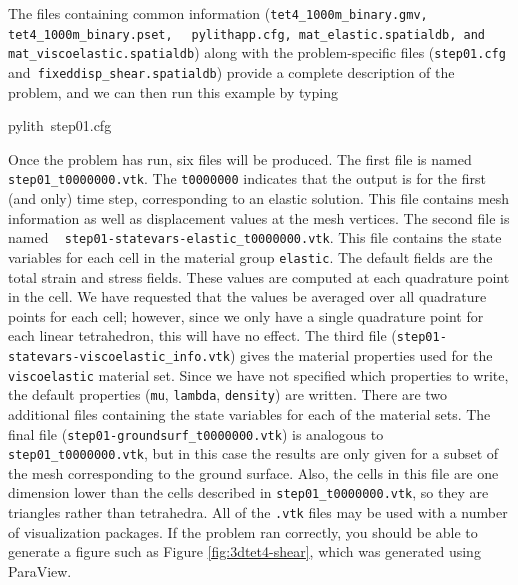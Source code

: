 The files containing common information (\texttt{tet4\_1000m\_binary.gmv,
tet4\_1000m\_binary.pset, }~\linebreak{}
\texttt{pylithapp.cfg, mat\_elastic.spatialdb, and mat\_viscoelastic.spatialdb})
along with the problem-specific files (\texttt{step01.cfg }and\texttt{
fixeddisp\_shear.spatialdb}) provide a complete description of the
problem, and we can then run this example by typing
\begin{lyxcode}
pylith~step01.cfg
\end{lyxcode}
Once the problem has run, six files will be produced. The first file
is named \texttt{step01\_t0000000.vtk}. The \texttt{t0000000} indicates
that the output is for the first (and only) time step, corresponding
to an elastic solution. This file contains mesh information as well
as displacement values at the mesh vertices. The second file is named
\texttt{}~\linebreak{}
\texttt{step01-statevars-elastic\_t0000000.vtk}. This file contains
the state variables for each cell in the material group \texttt{elastic}.
The default fields are the total strain and stress fields. These values
are computed at each quadrature point in the cell. We have requested
that the values be averaged over all quadrature points for each cell;
however, since we only have a single quadrature point for each linear
tetrahedron, this will have no effect. The third file (\texttt{step01-statevars-viscoelastic\_info.vtk})
gives the material properties used for the \texttt{viscoelastic} material
set. Since we have not specified which properties to write, the default
properties (\texttt{mu}, \texttt{lambda}, \texttt{density}) are written.
There are two additional files containing the state variables for
each of the material sets. The final file (\texttt{step01-groundsurf\_t0000000.vtk})
is analogous to \texttt{step01\_t0000000.vtk}, but in this case the
results are only given for a subset of the mesh corresponding to the
ground surface. Also, the cells in this file are one dimension lower
than the cells described in \texttt{step01\_t0000000.vtk}, so they
are triangles rather than tetrahedra. All of the \texttt{.vtk} files
may be used with a number of visualization packages. If the problem
ran correctly, you should be able to generate a figure such as Figure
\vref{fig:3dtet4-shear}, which was generated using ParaView.

